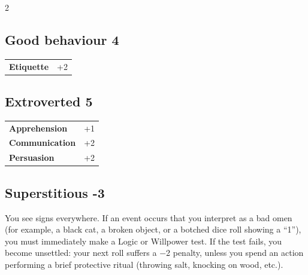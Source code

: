 \begin{multicols}{2}
\begin{tcolorbox}

\end{tcolorbox}

\begin{tcolorbox}
    \subsection*{Good behaviour \hfill \small{4 }}
    \tcblower




\begin{tabular}{@{}ll@{}}
    \textbf{Etiquette} & +2\\
\end{tabular}


\end{tcolorbox}

\begin{tcolorbox}
    \subsection*{Extroverted \hfill \small{5 }}
    \tcblower




\begin{tabular}{@{}ll@{}}
    \textbf{Apprehension} & +1\\
    \textbf{Communication} & +2\\
    \textbf{Persuasion} & +2\\
\end{tabular}


\end{tcolorbox}

\begin{tcolorbox}
    \subsection*{Superstitious \hfill \small{-3 }}
    \tcblower
You see signs everywhere. If an event occurs that you interpret as a bad omen (for example, a black cat, a broken object, or a botched dice roll showing a “1”), you must immediately make a Logic or Willpower test. If the test fails, you become unsettled: your next roll suffers a −2 penalty, unless you spend an action performing a brief protective ritual (throwing salt, knocking on wood, etc.).


\end{tcolorbox}
\end{multicols}
